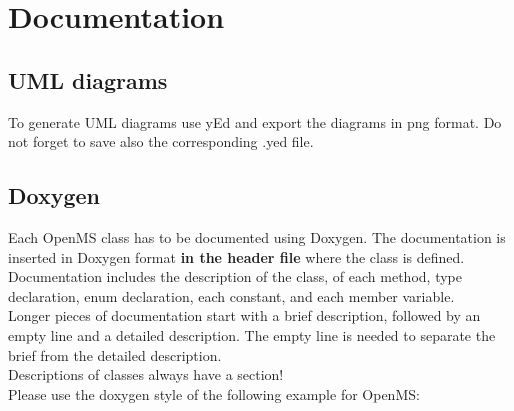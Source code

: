 \documentclass[a4]{article}
\begin{document}
\section{Documentation}

\subsection{UML diagrams}
To generate UML diagrams use yEd and export the diagrams in png format. Do not
forget to save also the corresponding .yed file.


\subsection{Doxygen}
Each OpenMS class has to be documented using Doxygen. The documentation is
inserted in Doxygen format \textbf{in the header file} where the class is
defined.  Documentation includes the description of the class, of each method,
type declaration, enum declaration, each constant, and each member variable.\\
Longer pieces of documentation start with a brief description, followed
by an empty line and a detailed description. The empty line is needed to separate
the brief from the detailed description.\\
Descriptions of classes always have a \@brief section!\\
Please use the doxygen style of the following example for OpenMS:
\end{document}
